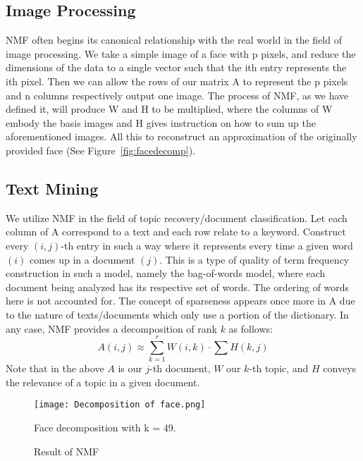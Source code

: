 \documentclass[
10pt, %
a4paper, %
oneside, %
headinclude,footinclude, %
BCOR5mm, %
]{scrartcl}
\begin{document}
\subsection{Image Processing}
NMF often begins its canonical relationship with the real world in the field of image processing. We take a simple image of a face with p pixels, and reduce the dimensions of the data to a single vector such that the ith entry represents the ith pixel. Then we can allow the rows of our matrix A to represent the p pixels and n columns respectively output one image. The process of NMF, as we have defined it, will produce W and H to be multiplied, where the columns of W embody the basis images and H gives instruction on how to sum up the aforementioned images. All this to reconstruct an approximation of the originally provided face (See Figure~\vref{fig:facedecomp}).

\subsection{Text Mining}
We utilize NMF in the field of topic recovery/document classification.
Let each column of A correspond to a text and each row relate to a keyword.
Construct every $(i,j)$-th entry in such a way where it represents every time a given word $(i)$ comes up in a document $(j)$.
This is a type of quality of term frequency construction in such a model, namely the bag-of-words model, where each document being analyzed has its respective set of words. The ordering of words here is not accounted for.
The concept of sparseness appears once more in A due to the nature of texts/documents which only use a portion of the dictionary. In any case, NMF provides a decomposition of rank $k$ as follows:
$$A(i,j)\approx\sum_{k=1}^{r}W(i,k)\cdot\sum H(k,j)$$
Note that in the above $A$ is our $j$-th document, $W$ our $k$-th topic, and $H$ conveys the relevance of a topic in a given document.

\begin{figure}[tb]
    \centering
    \texttt{[image: Decomposition of face.png]}
    \caption[Face Decomposition Using NMF]{Face decomposition with k = 49. \cite{colyer_2019}}
    \label{fig:facedecomp}
\end{figure}

\begin{figure}[tb]
    \centering
    \caption{Result of NMF}
    \label{fig:application}
\end{figure}

\renewcommand{\refname}{\spacedlowsmallcaps{References}} %




\end{document}

